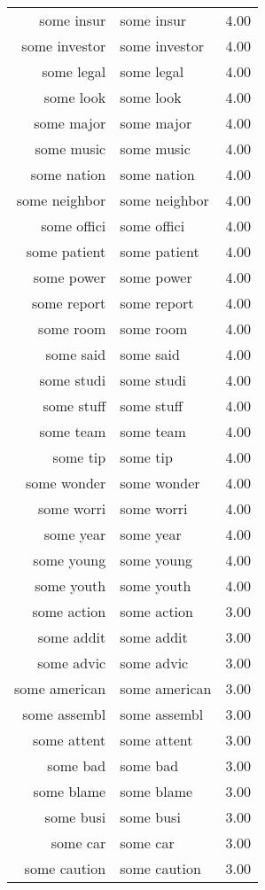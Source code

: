 \begin{table}[ht]
\begin{tabular}{rlr}
  some insur & some insur & 4.00 \\ 
  some investor & some investor & 4.00 \\ 
  some legal & some legal & 4.00 \\ 
  some look & some look & 4.00 \\ 
  some major & some major & 4.00 \\ 
  some music & some music & 4.00 \\ 
  some nation & some nation & 4.00 \\ 
  some neighbor & some neighbor & 4.00 \\ 
  some offici & some offici & 4.00 \\ 
  some patient & some patient & 4.00 \\ 
  some power & some power & 4.00 \\ 
  some report & some report & 4.00 \\ 
  some room & some room & 4.00 \\ 
  some said & some said & 4.00 \\ 
  some studi & some studi & 4.00 \\ 
  some stuff & some stuff & 4.00 \\ 
  some team & some team & 4.00 \\ 
  some tip & some tip & 4.00 \\ 
  some wonder & some wonder & 4.00 \\ 
  some worri & some worri & 4.00 \\ 
  some year & some year & 4.00 \\ 
  some young & some young & 4.00 \\ 
  some youth & some youth & 4.00 \\ 
  some action & some action & 3.00 \\ 
  some addit & some addit & 3.00 \\ 
  some advic & some advic & 3.00 \\ 
  some american & some american & 3.00 \\ 
  some assembl & some assembl & 3.00 \\ 
  some attent & some attent & 3.00 \\ 
  some bad & some bad & 3.00 \\ 
  some blame & some blame & 3.00 \\ 
  some busi & some busi & 3.00 \\ 
  some car & some car & 3.00 \\ 
  some caution & some caution & 3.00 \\ 

\end{tabular}
\end{table}
